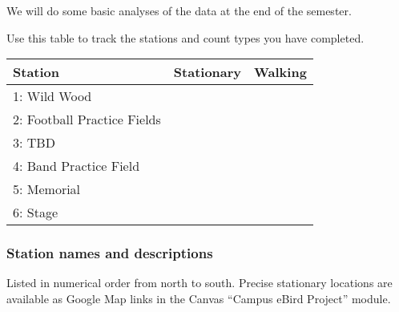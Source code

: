 \documentclass[12pt]{article}
\begin{document}
We will do some basic analyses of the data at the end of the semester.

Use this table to track the stations and count types you have completed.

\begin{tabular}{lcc}

\toprule

Station & Stationary & Walking \tabularnewline

\midrule

1: Wild Wood & & \tabularnewline

\midrule

2: Football Practice Fields & & \tabularnewline

\midrule

3: TBD & & \tabularnewline

\midrule

4: Band Practice Field & & \tabularnewline

\midrule

5: Memorial  & & \tabularnewline

\midrule

6: Stage & & \tabularnewline

\bottomrule

\end{tabular}

\newpage

\subsubsection*{Station names and descriptions}

Listed in numerical order from north to south. Precise stationary locations are available as Google Map links in the Canvas “Campus eBird Project” module.
\end{document}
